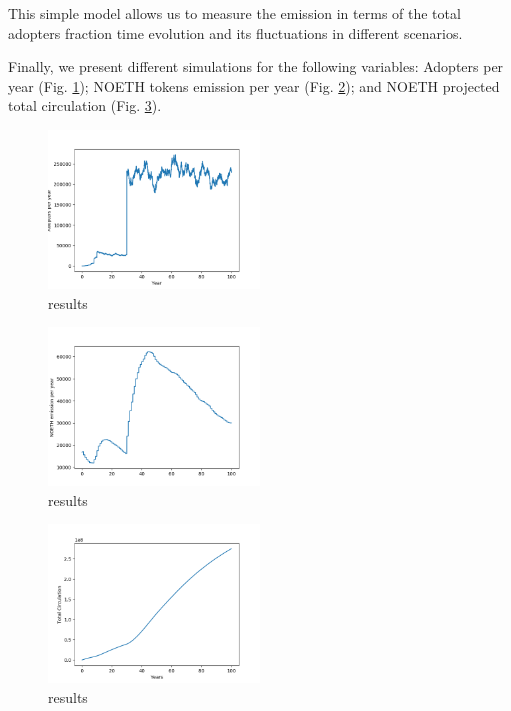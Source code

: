\documentclass[11pt]{amsart}
\numberwithin{equation}{section}
\theoremstyle{definition}
\theoremstyle{remark}
\renewcommand{\_}[1]{_{\left( #1 \right)}}
\renewcommand{\^}[1]{^{\left( #1 \right)}}
\begin{document}
This simple model allows us to measure the emission in terms of the total adopters fraction time evolution and its fluctuations in different scenarios.	

Finally, we present different simulations for the following variables: Adopters per year (Fig. \ref{fig: adopters}); NOETH tokens emission per year (Fig. \ref{fig: noeth_emission}); and NOETH projected total circulation (Fig. \ref{fig: total_circulation}).

\begin{figure}\label{fig:adopters}
	\centering
	\includegraphics[width=0.5\textwidth]{adopter_per_year}
	\caption{results}
	\label{fig: adopters}
\end{figure}

\begin{figure}\label{fig:emission}
	\centering
	\includegraphics[width=0.5\textwidth]{noth_emission}
	\caption{results}
	\label{fig: noeth_emission}
\end{figure}

\begin{figure}\label{fig:total_circulation}
	\centering
	\includegraphics[width=0.5\textwidth]{total_circulation}
	\caption{results}
	\label{fig: total_circulation}
\end{figure}
\end{document}
